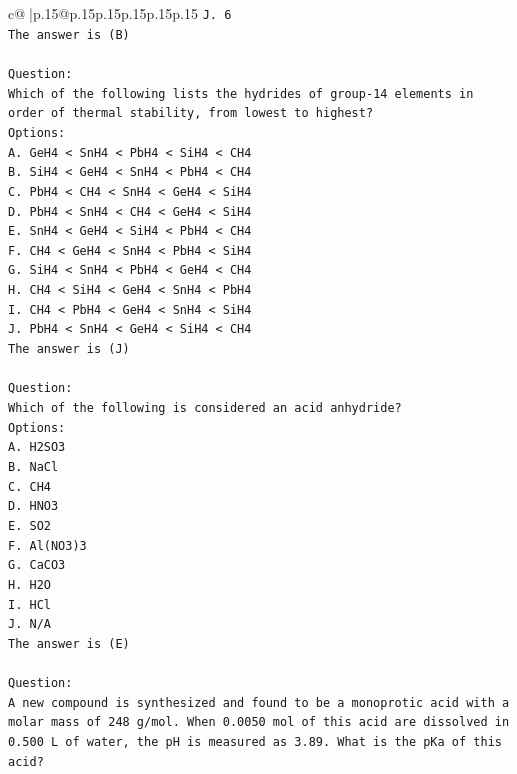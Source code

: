 \documentclass{article}
\begin{document}
{\begin{supertabular}{c@{$\;$}|p{.15\linewidth}@{}p{.15\linewidth}p{.15\linewidth}p{.15\linewidth}p{.15\linewidth}p{.15\linewidth}}
{{{\texttt{J. 6} \\
\texttt{The answer is (B)} \\
\\ 
\texttt{Question:} \\
\texttt{Which of the following lists the hydrides of group{-}14 elements in order of thermal stability, from lowest to highest?} \\
\texttt{Options:} \\
\texttt{A. GeH4 < SnH4 < PbH4 < SiH4 < CH4} \\
\texttt{B. SiH4 < GeH4 < SnH4 < PbH4 < CH4} \\
\texttt{C. PbH4 < CH4 < SnH4 < GeH4 < SiH4} \\
\texttt{D. PbH4 < SnH4 < CH4 < GeH4 < SiH4} \\
\texttt{E. SnH4 < GeH4 < SiH4 < PbH4 < CH4} \\
\texttt{F. CH4 < GeH4 < SnH4 < PbH4 < SiH4} \\
\texttt{G. SiH4 < SnH4 < PbH4 < GeH4 < CH4} \\
\texttt{H. CH4 < SiH4 < GeH4 < SnH4 < PbH4} \\
\texttt{I. CH4 < PbH4 < GeH4 < SnH4 < SiH4} \\
\texttt{J. PbH4 < SnH4 < GeH4 < SiH4 < CH4} \\
\texttt{The answer is (J)} \\
\\ 
\texttt{Question:} \\
\texttt{Which of the following is considered an acid anhydride?} \\
\texttt{Options:} \\
\texttt{A. H2SO3} \\
\texttt{B. NaCl} \\
\texttt{C. CH4} \\
\texttt{D. HNO3} \\
\texttt{E. SO2} \\
\texttt{F. Al(NO3)3} \\
\texttt{G. CaCO3} \\
\texttt{H. H2O} \\
\texttt{I. HCl} \\
\texttt{J. N/A} \\
\texttt{The answer is (E)} \\
\\ 
\texttt{Question:} \\
\texttt{A new compound is synthesized and found to be a monoprotic acid with a molar mass of 248 g/mol. When 0.0050 mol of this acid are dissolved in 0.500 L of water, the pH is measured as 3.89. What is the pKa of this acid?} \\
}}}
\end{supertabular}}
\end{document}
